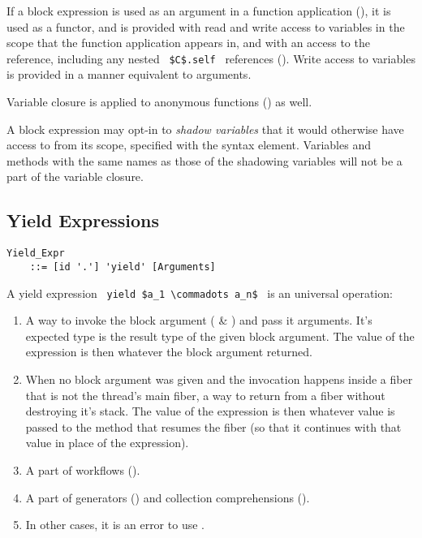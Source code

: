 If a block expression is used as an argument in a function application (), it is used as a functor, and is provided with read and write access to variables in the scope that the function application appears in, and with an access to the  reference, including any nested ~\lstinline!$C$.self!~ references (). Write access to variables is provided in a manner equivalent to  arguments. 

Variable closure is applied to anonymous functions () as well. 

A block expression may opt-in to {\em shadow variables} that it would otherwise have access to from its scope, specified with the  syntax element. Variables and methods with the same names as those of the shadowing variables will not be a part of the variable closure. 





\subsection{Yield Expressions}
\label{sec:yield-expressions}

\grammar\begin{lstlisting}
Yield_Expr 
    ::= [id '.'] 'yield' [Arguments]
\end{lstlisting}

A yield expression ~\lstinline!yield $a_1 \commadots a_n$!~ is an universal  operation:
\begin{enumerate}
  \item A way to invoke the block argument ( \& ) and pass it arguments. It's expected type is the result type of the given block argument. The value of the expression is then whatever the block argument returned. 
  \item When no block argument was given and the invocation happens inside a fiber that is not the thread's main fiber, a way to return from a fiber without destroying it's stack. The value of the expression is then whatever value is passed to the method that resumes the fiber (so that it continues with that value in place of the  expression). 
  \item A part of workflows ().
  \item A part of generators () and collection comprehensions ().
  \item In other cases, it is an error to use . 
\end{enumerate}

